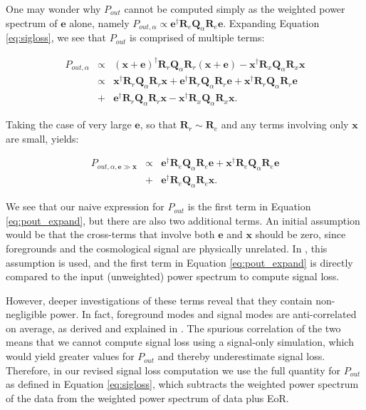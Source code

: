 \documentclass[preprint2,numberedappendix,tighten]{aastex6}  %
\begin{document}
One may wonder why $P_{out}$ cannot be computed simply as the weighted power spectrum of $\textbf{e}$ alone, namely $P_{out,\alpha} \propto \textbf{e}^{\dagger}\textbf{R}_{e}\textbf{Q}_{\alpha}\textbf{R}_{e}\textbf{e}$. Expanding Equation \ref{eq:sigloss}, we see that $P_{out}$ is comprised of multiple terms:

\begin{eqnarray}
\label{eq:crossterm}
P_{out,\alpha} &\propto& (\textbf{x}+\textbf{e})^{\dagger}\textbf{R}_{r}\textbf{Q}_{\alpha}\textbf{R}_{r}(\textbf{x}+\textbf{e}) - \textbf{x}^{\dagger}\textbf{R}_{x}\textbf{Q}_{\alpha}\textbf{R}_{x}\textbf{x} \nonumber \\
&\propto& \textbf{x}^{\dagger}\textbf{R}_{r}\textbf{Q}_{\alpha}\textbf{R}_{r}\textbf{x} + \textbf{e}^{\dagger}\textbf{R}_{r}\textbf{Q}_{\alpha}\textbf{R}_{r}\textbf{e} + \textbf{x}^{\dagger}\textbf{R}_{r}\textbf{Q}_{\alpha}\textbf{R}_{r}\textbf{e} \nonumber \\
&+& \textbf{e}^{\dagger}\textbf{R}_{r}\textbf{Q}_{\alpha}\textbf{R}_{r}\textbf{x} - \textbf{x}^{\dagger}\textbf{R}_{x}\textbf{Q}_{\alpha}\textbf{R}_{x}\textbf{x}.
\end{eqnarray}

Taking the case of very large $\textbf{e}$, so that $\textbf{R}_{r} \sim \textbf{R}_{e}$ and any terms involving only $\textbf{x}$ are small, yields:

\begin{eqnarray}
\label{eq:pout_expand}
P_{out, \alpha,\textbf{e} \gg \textbf{x}} &\propto& \textbf{e}^{\dagger}\textbf{R}_{e}\textbf{Q}_{\alpha}\textbf{R}_{e}\textbf{e} + \textbf{x}^{\dagger}\textbf{R}_{e}\textbf{Q}_{\alpha}\textbf{R}_{e}\textbf{e} \nonumber \\
&+& \textbf{e}^{\dagger}\textbf{R}_{e}\textbf{Q}_{\alpha}\textbf{R}_{e}\textbf{x}.
\end{eqnarray}

We see that our naive expression for $P_{out}$ is the first term in Equation \ref{eq:pout_expand}, but there are also two additional terms. An initial assumption would be that the cross-terms that involve both $\textbf{e}$ and $\textbf{x}$ should be zero, since foregrounds and the cosmological signal are physically unrelated. In \citet{ali_et_al2015}, this assumption is used, and the first term in Equation \ref{eq:pout_expand} is directly compared to the input (unweighted) power spectrum to compute signal loss.

However, deeper investigations of these terms reveal that they contain non-negligible power. In fact, foreground modes and signal modes are anti-correlated on average, as derived and explained in \citet{switzer_et_al2015}. The spurious correlation of the two means that we cannot compute signal loss using a signal-only simulation, which would yield greater values for $P_{out}$ and thereby underestimate signal loss. Therefore, in our revised signal loss computation we use the full quantity for $P_{out}$ as defined in Equation \ref{eq:sigloss}, which subtracts the weighted power spectrum of the data from the weighted power spectrum of data plus EoR. 
\end{document}
